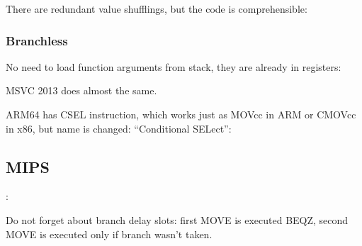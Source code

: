

There are redundant value shufflings, but the code is comprehensible:



\subsubsection{Branchless}

No need to load function arguments from stack, they are already in registers:



MSVC 2013 does almost the same.

ARM64 has CSEL instruction, which works just as MOVcc in ARM or CMOVcc in x86, but name is changed:
``Conditional SELect'':



\fi

\ifdefined\IncludeMIPS
\subsection{MIPS}

:



Do not forget about branch delay slots: first MOVE is executed  BEQZ, 
second MOVE is executed only if branch wasn't taken.

\fi
